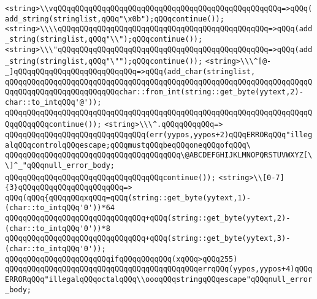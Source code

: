 \verb|<string>\\vqQQqqQQqqQQqqQQqqQQqqQQqqQQqqQQqqQQqqQQqqQQqqQQqqQQq=>qQQq(add_string(stringlist,qQQq"\x0b");qQQqcontinue());|\newline
\verb|<string>\\\\qQQqqQQqqQQqqQQqqQQqqQQqqQQqqQQqqQQqqQQqqQQqqQQq=>qQQq(add_string(stringlist,qQQq"\\");qQQqcontinue());|\newline
\verb|<string>\\\"qQQqqQQqqQQqqQQqqQQqqQQqqQQqqQQqqQQqqQQqqQQqqQQq=>qQQq(add_string(stringlist,qQQq"\"");qQQqcontinue());|\newline
\verb|<string>\\\^[@-_]qQQqqQQqqQQqqQQqqQQqqQQqqQQq=>qQQq(add_char(stringlist,|\newline
\verb|qQQqqQQqqQQqqQQqqQQqqQQqqQQqqQQqqQQqqQQqqQQqqQQqqQQqqQQqqQQqqQQqqQQqqQQqqQQqqQQqqQQqqQQqqQQqqQQqchar::from_int(string::get_byte(yytext,2)-char::to_intqQQq'@'));|\newline
\verb|qQQqqQQqqQQqqQQqqQQqqQQqqQQqqQQqqQQqqQQqqQQqqQQqqQQqqQQqqQQqqQQqqQQqqQQqqQQqqQQqcontinue());|\newline
\verb|<string>\\\^.qQQqqQQqqQQq=>|\newline
\verb|qQQqqQQqqQQqqQQqqQQqqQQqqQQqqQQq(err(yypos,yypos+2)qQQqERRORqQQq"illegalqQQqcontrolqQQqescape;qQQqmustqQQqbeqQQqoneqQQqofqQQq\|\newline
\verb|qQQqqQQqqQQqqQQqqQQqqQQqqQQqqQQqqQQqqQQq\@ABCDEFGHIJKLMNOPQRSTUVWXYZ[\\]^_"qQQqnull_error_body;|\newline
\verb|qQQqqQQqqQQqqQQqqQQqqQQqqQQqqQQqqQQqcontinue());|\newline
\verb|<string>\\[0-7]{3}qQQqqQQqqQQqqQQqqQQqqQQq=>|\newline
\verb|qQQq(qQQq{qQQqqQQqxqQQq=qQQq(string::get_byte(yytext,1)-(char::to_intqQQq'0'))*64|\newline
\verb|qQQqqQQqqQQqqQQqqQQqqQQqqQQqqQQq+qQQq(string::get_byte(yytext,2)-(char::to_intqQQq'0'))*8|\newline
\verb|qQQqqQQqqQQqqQQqqQQqqQQqqQQqqQQq+qQQq(string::get_byte(yytext,3)-(char::to_intqQQq'0'));|\newline
\verb|qQQqqQQqqQQqqQQqqQQqqQQqifqQQqqQQqqQQq(xqQQq>qQQq255)|\newline
\verb|qQQqqQQqqQQqqQQqqQQqqQQqqQQqqQQqqQQqqQQqqQQqerrqQQq(yypos,yypos+4)qQQqERRORqQQq"illegalqQQqoctalqQQq\\oooqQQqstringqQQqescape"qQQqnull_error_body;|\newline
